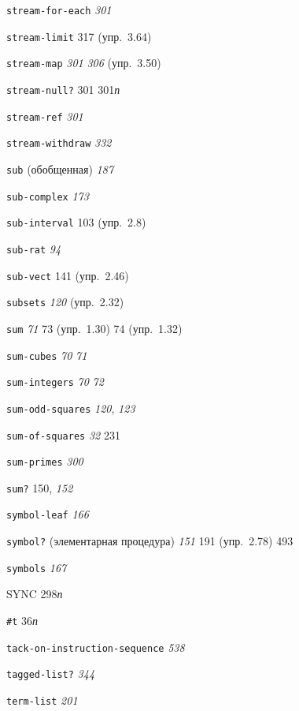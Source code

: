 \begin{theindex}
\item {\texttt{stream-for-each}} {\it 301}
\item {\texttt{stream-limit}} 317 (упр.~3.64)
\item {\texttt{stream-map}} {\it 301}
   {\it 306} (упр.~3.50)
\item {\texttt{stream-null?}} 301
   301{\it п}
\item {\texttt{stream-ref}} {\it 301}
\item {\texttt{stream-withdraw}} {\it 332}
\item {\texttt{sub} (обобщенная)} {\it 187}
\item {\texttt{sub-complex}} {\it 173}
\item {\texttt{sub-interval}} 103 (упр.~2.8)
\item {\texttt{sub-rat}} {\it 94}
\item {\texttt{sub-vect}} 141 (упр.~2.46)
\item {\texttt{subsets}} {\it 120} (упр.~2.32)
\item {\texttt{sum}} {\it 71}
   73 (упр.~1.30)
   74 (упр.~1.32)
\item {\texttt{sum-cubes}} {\it 70}
   {\it 71}
\item {\texttt{sum-integers}} {\it 70}
   {\it 72}
\item {\texttt{sum-odd-squares}} {\it 120}, {\it 123}
\item {\texttt{sum-of-squares}} {\it 32}
   231
\item {\texttt{sum-primes}} {\it 300}
\item {\texttt{sum?}} 150, {\it 152}
\item {\texttt{symbol-leaf}} {\it 166}
\item {\texttt{symbol?} (элементарная процедура)} {\it 151}
   191 (упр.~2.78)
   493
\item {\texttt{symbols}} {\it 167}
\item {SYNC} 298{\it п}
\bigskip
\item {\texttt{\#t}} 36{\it п}
\item {\texttt{tack-on-instruction-sequence}} {\it 538}
\item {\texttt{tagged-list?}} {\it 344}
\item {\texttt{term-list}} {\it 201}

\end{theindex}
